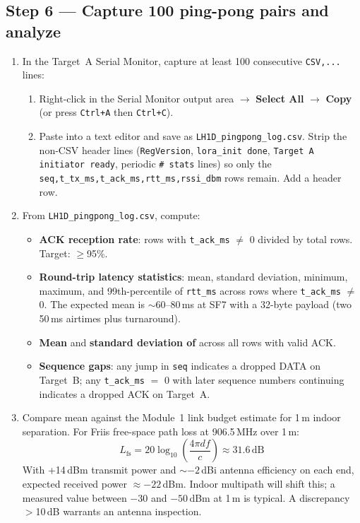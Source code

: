 \documentclass[11pt,letterpaper]{article}
\begin{document}
\subsection{Step 6 --- Capture 100 ping-pong pairs and analyze}
\begin{enumerate}[leftmargin=2em]
	\item In the Target~A Serial Monitor, capture at least 100 consecutive \texttt{CSV,...} lines:
	\begin{enumerate}[leftmargin=1.5em]
		\item Right-click in the Serial Monitor output area $\to$ \textbf{Select All} $\to$ \textbf{Copy} (or press \texttt{Ctrl+A} then \texttt{Ctrl+C}).
		\item Paste into a text editor and save as \texttt{LH1D\_pingpong\_log.csv}. Strip the non-CSV header lines (\texttt{RegVersion}, \texttt{lora\_init done}, \texttt{Target A initiator ready}, periodic \texttt{\# stats} lines) so only the \texttt{seq,t\_tx\_ms,t\_ack\_ms,rtt\_ms,rssi\_dbm} rows remain. Add a header row.
	\end{enumerate}
	\item From \texttt{LH1D\_pingpong\_log.csv}, compute:
	\begin{itemize}[leftmargin=1.5em]
		\item \textbf{ACK reception rate}: rows with \texttt{t\_ack\_ms} $\ne$ 0 divided by total rows. Target: $\geq$95\%.
		\item \textbf{Round-trip latency statistics}: mean, standard deviation, minimum, maximum, and 99th-percentile of \texttt{rtt\_ms} across rows where \texttt{t\_ack\_ms} $\ne$ 0. The expected mean is $\sim$60--80\,ms at SF7 with a 32-byte payload (two 50\,ms airtimes plus turnaround).
		\item \textbf{Mean \RSSI{}} and \textbf{standard deviation of \RSSI{}} across all rows with valid ACK.
		\item \textbf{Sequence gaps}: any jump in \texttt{seq} indicates a dropped DATA on Target~B; any \texttt{t\_ack\_ms} $=$ 0 with later sequence numbers continuing indicates a dropped ACK on Target~A.
	\end{itemize}
	\item Compare mean \RSSI{} against the Module~1 link budget estimate for 1\,m indoor separation. For Friis free-space path loss at 906.5\,MHz over 1\,m:
	\[
		L_{\text{fs}} = 20\log_{10}\!\left(\frac{4\pi d f}{c}\right) \approx 31.6\,\text{dB}
	\]
	With +14\,dBm transmit power and $\sim-2$\,dBi antenna efficiency on each end, expected received power $\approx -22$\,dBm. Indoor multipath will shift this; a measured value between $-30$ and $-50$\,dBm at 1\,m is typical. A discrepancy $>$10\,dB warrants an antenna inspection.
\end{enumerate}
\end{document}
